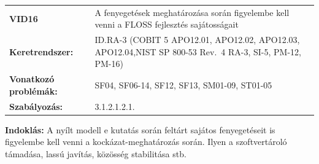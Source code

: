 \documentclass[12pt,magyar,a4paper,oneside]{scrreprt}
\begin{document}
\begin{longtable}[]{@{}ll@{}}
\toprule
\endhead
\begin{minipage}[t]{0.16\columnwidth}\raggedright
\textbf{VID16}\strut
\end{minipage} & \begin{minipage}[t]{0.79\columnwidth}\raggedright
A fenyegetések meghatározása során figyelembe kell venni a FLOSS
fejlesztés sajátosságait\strut
\end{minipage}\tabularnewline
\begin{minipage}[t]{0.16\columnwidth}\raggedright
\textbf{Keretrendszer:}\strut
\end{minipage} & \begin{minipage}[t]{0.79\columnwidth}\raggedright
ID.RA-3 (COBIT 5 APO12.01, APO12.02, APO12.03, APO12.04,NIST SP 800-53
Rev.~4 RA-3, SI-5, PM-12, PM-16)\strut
\end{minipage}\tabularnewline
\begin{minipage}[t]{0.16\columnwidth}\raggedright
\textbf{Vonatkozó problémák:}\strut
\end{minipage} & \begin{minipage}[t]{0.79\columnwidth}\raggedright
SF04, SF06-14, SF12, SF13, SM01-09, ST01-05\strut
\end{minipage}\tabularnewline
\begin{minipage}[t]{0.16\columnwidth}\raggedright
\textbf{Szabályozás:}\strut
\end{minipage} & \begin{minipage}[t]{0.79\columnwidth}\raggedright
3.1.2.1.2.1.\strut
\end{minipage}\tabularnewline
\bottomrule
\end{longtable}

\textbf{Indoklás: } A nyílt modell e kutatás során feltárt sajátos
fenyegetéseit is figyelembe kell venni a kockázat-meghatározás során.
Ilyen a szoftvertároló támadása, lassú javítás, közösség stabilitása
stb.
\end{document}

